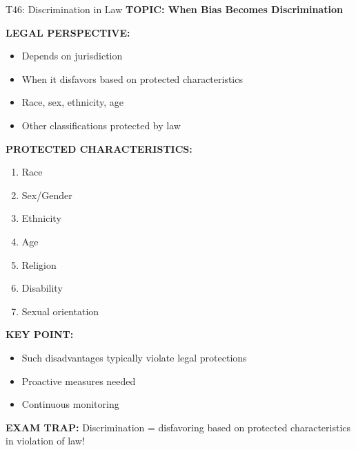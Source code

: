\documentclass[8pt]{beamer}
\begin{document}
	\begin{frame}{T46: Discrimination in Law}
		\fontsize{6.5}{7.5}\selectfont
		\textbf{TOPIC: When Bias Becomes Discrimination}
		
		\vspace{0.1cm}
		\textbf{LEGAL PERSPECTIVE:}
		\begin{itemize}
			\item Depends on jurisdiction
			\item When it disfavors based on protected characteristics
			\item Race, sex, ethnicity, age
			\item Other classifications protected by law
		\end{itemize}
		
		\vspace{0.1cm}
		\textbf{PROTECTED CHARACTERISTICS:}
		\begin{enumerate}
			\item Race
			\item Sex/Gender
			\item Ethnicity
			\item Age
			\item Religion
			\item Disability
			\item Sexual orientation
		\end{enumerate}
		
		\vspace{0.1cm}
		\textbf{KEY POINT:}
		\begin{itemize}
			\item Such disadvantages typically violate legal protections
			\item Proactive measures needed
			\item Continuous monitoring
		\end{itemize}
		
		\textcolor{myred}{\textbf{EXAM TRAP:}} Discrimination = \textcolor{myblue}{disfavoring based on protected characteristics} in violation of law!
	\end{frame}
	
\end{document}
